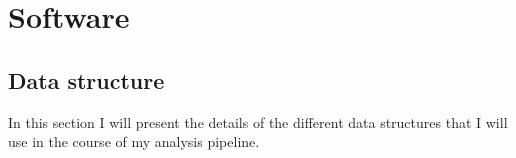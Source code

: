 \chapter{Software}

\section{Data structure}
In this section I will present the details of the different data structures that I will use in the course of my analysis pipeline.

